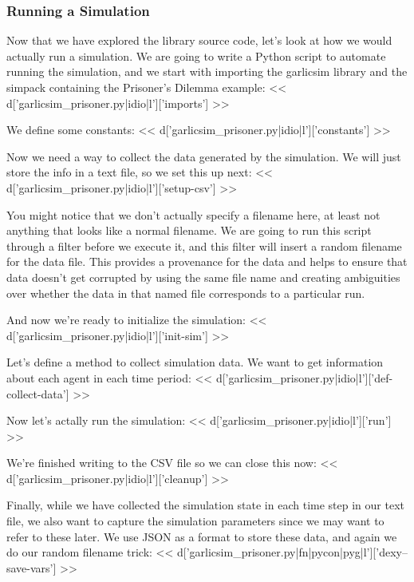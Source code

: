 \documentclass[custom, plainsections]{sciposter}
\begin{document}
\begin{multicols*}{2}
\subsubsection*{Running a Simulation}

Now that we have explored the library source code, let's look at how we would actually run a simulation. We are going to write a Python script to automate running the simulation, and we start with importing the garlicsim library and the simpack containing the Prisoner's Dilemma example:
\tiny
<< d['garlicsim_prisoner.py|idio|l']['imports'] >>
\small

We define some constants:
\tiny
<< d['garlicsim_prisoner.py|idio|l']['constants'] >>
\small

Now we need a way to collect the data generated by the simulation. We will just store the info in a text file, so we set this up next:
\tiny
<< d['garlicsim_prisoner.py|idio|l']['setup-csv'] >>
\small

You might notice that we don't actually specify a filename here, at least not anything that looks like a normal filename. We are going to run this script through a filter before we execute it, and this filter will insert a random filename for the data file. This provides a provenance for the data and helps to ensure that data doesn't get corrupted by using the same file name and creating ambiguities over whether the data in that named file corresponds to a particular run.

And now we're ready to initialize the simulation:
\tiny
<< d['garlicsim_prisoner.py|idio|l']['init-sim'] >>
\small

Let's define a method to collect simulation data. We want to get information about each agent in each time period:
\tiny
<< d['garlicsim_prisoner.py|idio|l']['def-collect-data'] >>
\small

Now let's actally run the simulation:
\tiny
<< d['garlicsim_prisoner.py|idio|l']['run'] >>
\small

We're finished writing to the CSV file so we can close this now:
\tiny
<< d['garlicsim_prisoner.py|idio|l']['cleanup'] >>
\small

Finally, while we have collected the simulation state in each time step in our text file, we also want to capture the simulation parameters since we may want to refer to these later. We use JSON as a format to store these data, and again we do our random filename trick:
\tiny
<< d['garlicsim_prisoner.py|fn|pycon|pyg|l']['dexy--save-vars'] >>
\small


\end{multicols*}
\end{document}
